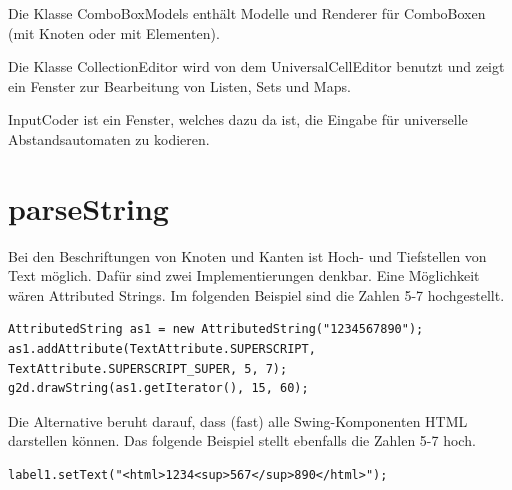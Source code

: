 Die Klasse ComboBoxModels enthält Modelle und Renderer für ComboBoxen (mit Knoten oder mit Elementen).

Die Klasse CollectionEditor wird von dem UniversalCellEditor benutzt und zeigt ein Fenster zur Bearbeitung von Listen, Sets und Maps.

InputCoder ist ein Fenster, welches dazu da ist, die Eingabe für universelle Abstandsautomaten zu kodieren.

\section{parseString}
Bei den Beschriftungen von Knoten und Kanten ist Hoch- und Tiefstellen von Text möglich. Dafür sind zwei Implementierungen denkbar. Eine Möglichkeit wären Attributed Strings. Im folgenden Beispiel sind die Zahlen 5-7 hochgestellt.
\begin{lstlisting}
AttributedString as1 = new AttributedString("1234567890");
as1.addAttribute(TextAttribute.SUPERSCRIPT, TextAttribute.SUPERSCRIPT_SUPER, 5, 7);
g2d.drawString(as1.getIterator(), 15, 60);
\end{lstlisting}

Die Alternative beruht darauf, dass (fast) alle Swing-Komponenten HTML darstellen können. Das folgende Beispiel stellt ebenfalls die Zahlen 5-7 hoch. 
\begin{lstlisting}
label1.setText("<html>1234<sup>567</sup>890</html>");
\end{lstlisting}

